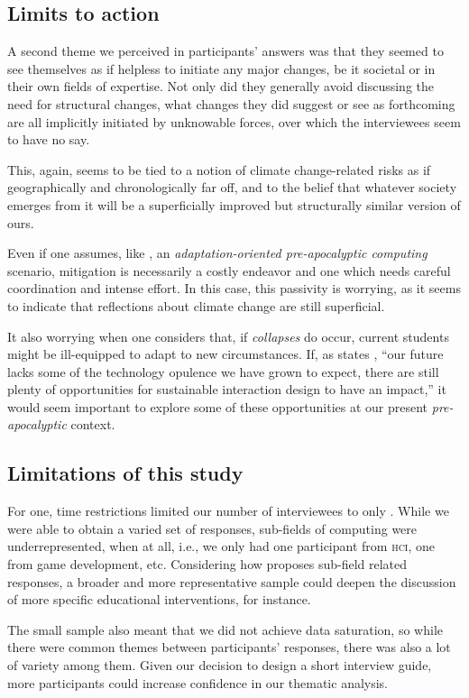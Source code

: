 \subsection{Limits to action}

A second theme we perceived in participants' answers was that they seemed to see themselves as if helpless to initiate any major changes, be it societal or in their own fields of expertise. Not only did they generally avoid discussing the need for structural changes, what changes they did suggest or see as forthcoming are all implicitly initiated by unknowable forces, over which the interviewees seem to have no say.

This, again, seems to be tied to a notion of climate change-related risks as if geographically and chronologically far off, and to the belief that whatever society emerges from it will be a superficially improved but structurally similar version of ours.

Even if one assumes, like \citeauthor{easterbrook2010climate}, an \emph{adaptation-oriented pre-apocalyptic computing} scenario, mitigation is necessarily a costly endeavor and one which needs careful coordination and intense effort. In this case, this passivity is worrying, as it seems to indicate that reflections about climate change are still superficial.

It also worrying when one considers that, if \emph{collapses} do occur, current students might be ill-equipped to adapt to new circumstances. If, as states \citeauthor{wong2009prepare}, ``our future lacks some of the technology opulence we have grown to expect, there are still plenty of opportunities for sustainable interaction design to have an impact,'' it would seem important to explore some of these opportunities at our present \emph{pre-apocalyptic} context.




\subsection{Limitations of this study}
For one, time restrictions limited our number of interviewees to only . While we were able to obtain a varied set of responses, sub-fields of computing were underrepresented, when at all, i.e., we only had one participant from \textsc{hci}, one from game development, etc. Considering how \cite{easterbrook2010climate} proposes sub-field related responses, a broader and more representative sample could deepen the discussion of more specific educational interventions, for instance.

The small sample also meant that we did not achieve data saturation, so while there were common themes between participants' responses, there was also a lot of variety among them. Given our decision to design a short interview guide, more participants could increase confidence in our thematic analysis.